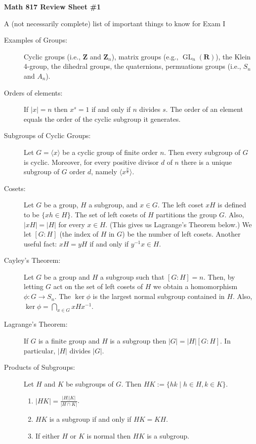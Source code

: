 \documentclass[12pt]{article}
\begin{document}

\centerline{{\bf Math 817 Review Sheet \#1}}
\smallskip
\centerline{{A (not necessarily complete) list of important things to know for Exam I}}

\begin{description}

\item[Examples of Groups:]  Cyclic groups (i.e., $\mathbf Z$ and $\mathbf Z_n$), matrix groups (e.g., $\operatorname{GL}_n(\mathbf R)$), the Klein 4-group, the dihedral groups,
the quaternions, permuations groups (i.e., $S_n$ and $A_n$).

\item[Orders of elements:] If $|x|=n$ then $x^s=1$ if and only if $n$ divides $s$.  The order of an element equals the order of the cyclic subgroup it generates.

\item[Subgroups of Cyclic Groups:]Let $G=\langle x\rangle$ be a cyclic group of finite order $n$.  Then every subgroup of $G$ is cyclic.  Moreover, for every positive divisor $d$ of $n$ there is a unique subgroup of $G$ order $d$, namely $\langle x^{\frac{n}{d}} \rangle$.

\item[Cosets:]  Let $G$ be a group, $H$ a subgroup, and $x\in G$.  The left coset $xH$ is defined to be $\{xh\in H\}$.   The set of left cosets of $H$ partitions the group $G$.  Also, $|xH|=|H|$ for every $x\in H$.  (This gives us Lagrange's Theorem below.)  We let $[G:H]$ (the index of $H$ in $G$) be the number of left cosets.  Another useful fact: $xH=yH$ if and only if $y^{-1}x\in H$.

\item[Cayley's Theorem:]  Let $G$ be a group and $H$ a subgroup such that $[G:H]=n$.  Then, by letting $G$ act on the set of left cosets of $H$ we obtain a homomorphism $\phi:G\to S_n$.  The $\ker \phi$ is the largest normal subgroup contained in $H$.  Also, $\ker \phi =\bigcap_{x\in G} xHx^{-1}$.

\item[Lagrange's Theorem:]  If $G$ is a finite group and $H$ is a subgroup then $|G|=|H|[G:H]$.  In particular, $|H|$ divides $|G|$.

\item[Products of Subgroups:] Let $H$ and $K$ be subgroups of $G$.  Then $HK:=\{hk\mid h\in H, k\in K\}$.   
\begin{enumerate}
\item $|HK|=\frac{|H||K|}{|H\cap K|}$.  
\item $HK$ is a subgroup if and only if $HK=KH$.
\item If either $H$ or $K$ is normal then $HK$ is a subgroup.
\end{enumerate}


\end{description}
\end{document}
